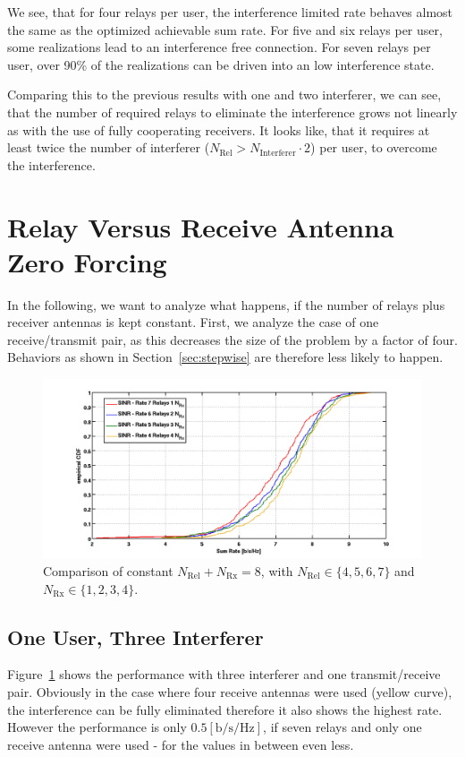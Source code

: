 We see, that for four relays per user, the interference limited rate behaves almost the same as the optimized achievable sum rate.
For five and six relays per user, some realizations lead to an interference free connection.
For seven relays per user, over 90\% of the realizations can be driven into an low interference state.

Comparing this to the previous results with one and two interferer, we can see, that  the number of required relays to eliminate the interference grows not linearly as with the use of fully cooperating receivers.
It looks like, that it requires at least twice the number of interferer ($N_\text{Rel} > N_\text{Interferer}\cdot2$) per user, to overcome the interference.

\section{Relay Versus Receive Antenna Zero Forcing}
\label{sec:rel_rx_comp}

In the following, we want to analyze what happens, if the number of relays plus receiver antennas is kept constant.
First, we analyze the case of one receive/transmit pair, as this decreases the size of the problem by a factor of four.
Behaviors as shown in Section~\ref{sec:stepwise} are therefore less likely to happen.

\begin{figure}[h]
\centering
  \includegraphics[width=0.9\linewidth]{images/ConstNrelNrx8comparison_1Rx_onlySINR.png}
\caption{Comparison of constant $N_\text{Rel} + N_{\text{Rx}} = 8$, with $N_\text{Rel}\in\{4,5,6,7\}$ and $N_{\text{Rx}}\in\{1,2,3,4\}$.}
\label{fig:1user_const}
\end{figure}
\subsection{One User, Three Interferer}
\label{sec:1user_const}
Figure~\ref{fig:1user_const} shows the performance with three interferer and one transmit/receive pair.
Obviously in the case where four receive antennas were used (yellow curve), the interference can be fully eliminated therefore it also shows the highest rate.
However the performance is only $0.5 \left[\text{b/s/Hz}\right]$, if seven relays and only one receive antenna were used - for the values in between even less.

